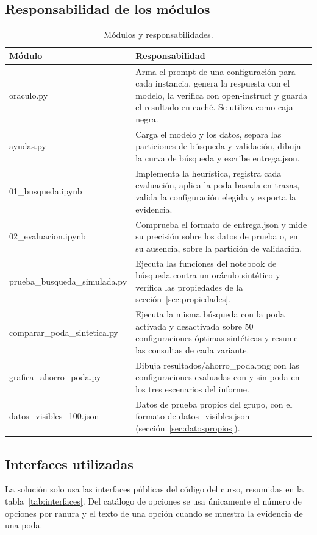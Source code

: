 \documentclass[12pt,letterpaper]{article}
\theoremstyle{definition}
\begin{document}
\subsection{Responsabilidad de los módulos}

\begin{table}[H]
\caption{Módulos y responsabilidades.}
\begin{tabularx}{\textwidth}{@{}p{5cm}L@{}}
\toprule
Módulo & Responsabilidad \\
\midrule
oraculo.py & Arma el prompt de una configuración para cada instancia, genera la respuesta con el modelo, la verifica con open-instruct y guarda el resultado en caché. Se utiliza como caja negra. \\
ayudas.py & Carga el modelo y los datos, separa las particiones de búsqueda y validación, dibuja la curva de búsqueda y escribe entrega.json. \\
01\_busqueda.ipynb & Implementa la heurística, registra cada evaluación, aplica la poda basada en trazas, valida la configuración elegida y exporta la evidencia. \\
02\_evaluacion.ipynb & Comprueba el formato de entrega.json y mide su precisión sobre los datos de prueba o, en su ausencia, sobre la partición de validación. \\
prueba\_busqueda\_simulada.py & Ejecuta las funciones del notebook de búsqueda contra un oráculo sintético y verifica las propiedades de la sección~\ref{sec:propiedades}. \\
comparar\_poda\_sintetica.py & Ejecuta la misma búsqueda con la poda activada y desactivada sobre 50 configuraciones óptimas sintéticas y resume las consultas de cada variante. \\
grafica\_ahorro\_poda.py & Dibuja resultados/ahorro\_poda.png con las configuraciones evaluadas con y sin poda en los tres escenarios del informe. \\
datos\_visibles\_100.json & Datos de prueba propios del grupo, con el formato de datos\_visibles.json (sección~\ref{sec:datospropios}). \\
\bottomrule
\end{tabularx}
\end{table}

\subsection{Interfaces utilizadas}
La solución solo usa las interfaces públicas del código del curso, resumidas en la tabla~\ref{tab:interfaces}. Del catálogo de opciones se usa únicamente el número de opciones por ranura y el texto de una opción cuando se muestra la evidencia de una poda.
\end{document}
